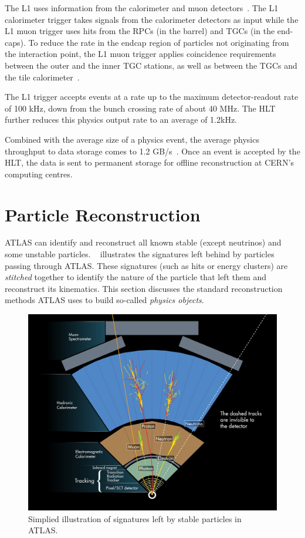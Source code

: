 The L1 uses information from the calorimeter and muon detectors~\cite{ATLAS_TDAQ}. The L1 calorimeter trigger takes signals from the calorimeter detectors as input while the L1 muon trigger uses hits from the RPCs (in the barrel) and TGCs (in the end-caps). To reduce the rate in the endcap region of particles not originating from the interaction point, the L1 muon trigger applies coincidence requirements between the outer and the inner TGC stations, as well as between the TGCs and the tile calorimeter~\cite{ATLAS_TDAQ}.

The L1 trigger accepts events at a rate up to the maximum detector-readout rate of 100 kHz, down from the bunch crossing rate of about 40 MHz. The HLT further reduces this physics output rate to an average of 1.2kHz. 

Combined with the average size of a physics event, the average physics throughput to data storage comes to 1.2 GB/s~\cite{ATLAS_TDAQ}. Once an event is accepted by the HLT, the data is sent to permanent storage for offline reconstruction at CERN’s computing centres.

\section{Particle Reconstruction} \label{sec:reco}

ATLAS can identify and reconstruct all known stable (except neutrinos) and some unstable particles. ~ illustrates the signatures left behind by particles passing through ATLAS. These signatures (such as hits or energy clusters) are \textit{stitched} together to identify the nature of the particle that left them and reconstruct its kinematics. This section discusses the standard reconstruction methods ATLAS uses to build so-called \textit{physics objects}.

\begin{figure}[!ht]
    \centering
    \includegraphics[width=0.8\linewidth]{figures//experiment/particlesATLAS.png}
    \caption{Simplied illustration of signatures left by stable particles in ATLAS.~\cite{Pequenao:1505342}}
    \label{fig:atlas-particles}
\end{figure}

